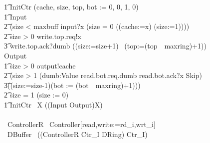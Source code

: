 \documentclass[10pt]{article}
\begin{document}
\begin{circus}
\t1 InitCtr \circdef (cache, size, top, bot := 0, 0, 1, 0) \\
\t1 Input \circdef \\
\t2 (\lcircguard size < maxbuff \rcircguard \circguard input?x \then (\lcircguard size = 0 \rcircguard \circguard ((cache:=x) \circseq (size:=1))))\\
\t2 \extchoice \lcircguard size > 0 \rcircguard \circguard write.top.req!x \then \\
\t3 write.top.ack?dumb \then ((size:=size+1) \circseq\ (top:=(top~\mod~maxring)+1))
    \\
 Output \circdef \\
 \t1 \lcircguard size > 0 \rcircguard \circguard output!cache \then\\
 \t2 (\lcircguard size > 1 \rcircguard \circguard (\Intchoice dumb:Value \circspot read.bot.req.dumb \then read.bot.ack?x \then Skip) \circseq \\
 \t3((size:=size-1)\circseq (bot := (bot~\mod~maxring)+1)))\\
 \t2 \extchoice \lcircguard size = 1 \rcircguard \circguard (size := 0) \\
\t1 \circspot InitCtr \circseq\ \circmu X \circspot ((Input \extchoice Output)\circseq X)
\\
\circend
\\
\circprocess\ ControllerR \circdef\ Controller[read,write:=rd\_i,wrt\_i]
\\
\circprocess\ DBuffer \circdef\ ((ControllerR \lpar Ctr\_I \rpar DRing) \circhide Ctr\_I)
\end{circus}%
\end{document}
